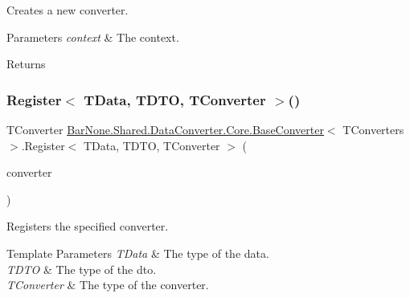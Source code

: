 Creates a new converter. 


\begin{DoxyParams}{Parameters}
{\em context} & The context.\\
\hline
\end{DoxyParams}
\begin{DoxyReturn}{Returns}

\end{DoxyReturn}
\mbox{\label{class_bar_none_1_1_shared_1_1_data_converter_1_1_core_1_1_base_converter_a18cccd9a951fe46931311fbfe8c2bc1c}} 
\subsubsection{\texorpdfstring{Register$<$ T\+Data, T\+D\+T\+O, T\+Converter $>$()}{Register< TData, TDTO, TConverter >()}}
{\footnotesize\ttfamily T\+Converter \mbox{\hyperlink{class_bar_none_1_1_shared_1_1_data_converter_1_1_core_1_1_base_converter}{Bar\+None.\+Shared.\+Data\+Converter.\+Core.\+Base\+Converter}}$<$ T\+Converters $>$.Register$<$ T\+Data, T\+D\+TO, T\+Converter $>$ (\begin{DoxyParamCaption}\item[{T\+Converter}]{converter }\end{DoxyParamCaption})\hspace{0.3cm}{\ttfamily [protected]}}



Registers the specified converter. 


\begin{DoxyTemplParams}{Template Parameters}
{\em T\+Data} & The type of the data.\\
\hline
{\em T\+D\+TO} & The type of the dto.\\
\hline
{\em T\+Converter} & The type of the converter.\\
\hline
\end{DoxyTemplParams}

